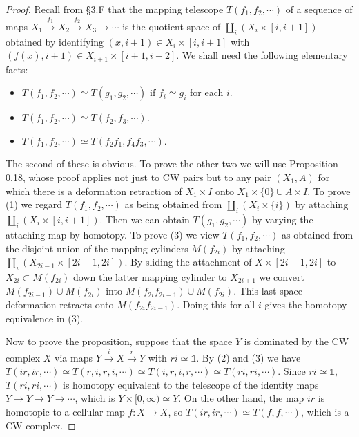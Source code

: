 \documentclass{article}
\theoremstyle{definition}
\begin{document}
\begin{proof}
Recall from \S3.F that the mapping telescope $T(f_1, f_2, \cdots)$ of a sequence of maps $X_1 \xrightarrow{f_1} X_2 \xrightarrow{f_2} X_3 \longrightarrow \cdots$ is the quotient space of $\coprod_i(X_i \times [i, i+1])$ obtained by identifying $(x, i+1) \in X_i \times [i, i+1]$ with $(f(x), i+1) \in X_{i+1} \times [i+1, i+2]$. We shall need the following elementary facts:
\begin{itemize}
\item[(1)] $T(f_1, f_2, \cdots) \simeq T(g_1, g_2, \cdots)$ if $f_i \simeq g_i$ for each $i$.
\item[(2)] $T(f_1, f_2, \cdots) \simeq T(f_2, f_3, \cdots)$.
\item[(3)] $T(f_1, f_2, \cdots) \simeq T(f_2 f_1, f_4 f_3, \cdots)$.
\end{itemize}

The second of these is obvious. To prove the other two we will use Proposition 0.18, whose proof applies not just to CW pairs but to any pair $(X_1, A)$ for which there is a deformation retraction of $X_1 \times I$ onto $X_1 \times \{0\} \cup A \times I$. To prove (1) we regard $T(f_1, f_2, \cdots)$ as being obtained from $\coprod_i(X_i \times \{i\})$ by attaching $\coprod_i(X_i \times [i, i+1])$. Then we can obtain $T(g_1, g_2, \cdots)$ by varying the attaching map by homotopy. To prove (3) we view $T(f_1, f_2, \cdots)$ as obtained from the disjoint union of the mapping cylinders $M(f_{2i})$ by attaching $\coprod_i(X_{2i-1} \times [2i-1, 2i])$. By sliding the attachment of $X \times [2i-1, 2i]$ to $X_{2i} \subset M(f_{2i})$ down the latter mapping cylinder to $X_{2i+1}$ we convert $M(f_{2i-1}) \cup M(f_{2i})$ into $M(f_{2i}f_{2i-1}) \cup M(f_{2i})$. This last space deformation retracts onto $M(f_{2i}f_{2i-1})$. Doing this for all $i$ gives the homotopy equivalence in (3).

Now to prove the proposition, suppose that the space $Y$ is dominated by the CW complex $X$ via maps $Y \xrightarrow{i} X \xrightarrow{r} Y$ with $ri \simeq \mathbb{1}$. By (2) and (3) we have $T(ir, ir, \cdots) \simeq T(r, i, r, i, \cdots) \simeq T(i, r, i, r, \cdots) \simeq T(ri, ri, \cdots)$. Since $ri \simeq \mathbb{1}$, $T(ri, ri, \cdots)$ is homotopy equivalent to the telescope of the identity maps $Y \to Y \to Y \to \cdots$, which is $Y \times [0, \infty) \simeq Y$. On the other hand, the map $ir$ is homotopic to a cellular map $f: X \to X$, so $T(ir, ir, \cdots) \simeq T(f, f, \cdots)$, which is a CW complex.
\end{proof}
\end{document}

